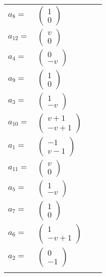\documentclass[1p]{elsarticle_modified}
\theoremstyle{definition}
\begin{document}
\begin{tabular}{m{7pt} m{180pt} m{7pt} m{180pt} }
\flushright $a_{8}=$&$\begin{pmatrix}1\\0\end{pmatrix}$ \\
\flushright $a_{12}=$&$\begin{pmatrix}v\\0\end{pmatrix}$ \\
\flushright $a_{4}=$&$\begin{pmatrix}0\\- v\end{pmatrix}$ \\
\flushright $a_{9}=$&$\begin{pmatrix}1\\0\end{pmatrix}$ \\
\flushright $a_{3}=$&$\begin{pmatrix}1\\- v\end{pmatrix}$ \\
\flushright $a_{10}=$&$\begin{pmatrix}v+1\\- v+1\end{pmatrix}$ \\
\flushright $a_{1}=$&$\begin{pmatrix}-1\\v-1\end{pmatrix}$ \\
\flushright $a_{11}=$&$\begin{pmatrix}v\\0\end{pmatrix}$ \\
\flushright $a_{5}=$&$\begin{pmatrix}1\\- v\end{pmatrix}$ \\
\flushright $a_{7}=$&$\begin{pmatrix}1\\0\end{pmatrix}$ \\
\flushright $a_{6}=$&$\begin{pmatrix}1\\- v+1\end{pmatrix}$ \\
\flushright $a_{2}=$&$\begin{pmatrix}0\\-1\end{pmatrix}$\\&\end{tabular}
\end{document}
